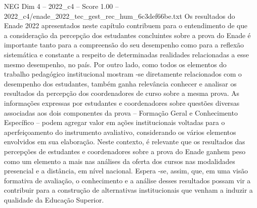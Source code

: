 \begin{textsample}{NEG Dim 4 – 2022\_c4 – Score 1.00 – 2022\_c4/enade\_2022\_tec\_gest\_rec\_hum\_6c3def66be.txt}
Os resultados do Enade 2022 apresentados neste capítulo contribuem para o entendimento de que a consideração da percepção dos estudantes concluintes sobre a prova do Enade é importante tanto para a compreensão do seu desempenho como para a reflexão sistemática e constante a respeito de determinadas realidades relacionadas a esse mesmo desempenho, no país.
Por outro lado, como todos os elementos do trabalho pedagógico institucional mostram -se diretamente relacionados com o desempenho dos estudantes, também ganha relevância conhecer e analisar os resultados da percepção dos coordenadores de curso sobre a mesma prova.
As informações expressas por estudantes e coordenadores sobre questões diversas associadas aos dois componentes da prova – Formação Geral e Conhecimento Específico – podem agregar valor em ações institucionais voltadas para o aperfeiçoamento do instrumento avaliativo, considerando os vários elementos envolvidos em sua elaboração.
Neste contexto, é relevante que os resultados das percepções de estudantes e coordenadores sobre a prova do Enade ganhem peso como um elemento a mais nas análises da oferta dos cursos nas modalidades presencial e a distância, em nível nacional.
Espera -se, assim, que, em uma visão formativa de avaliação, o conhecimento e a análise desses resultados possam vir a contribuir para a construção de alternativas institucionais que venham a induzir a qualidade da Educação Superior.

\end{textsample}
